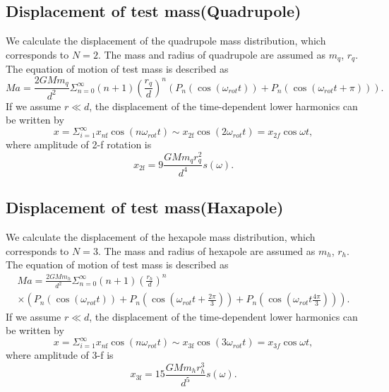 \documentclass[12pt]{iopart}
\begin{document}
\subsection{Displacement of test mass(Quadrupole)} \label{Quad}
We calculate the displacement of the quadrupole mass distribution, which corresponds to $N=2$.
The mass and radius of quadrupole are assumed as $m_q$, $r_q$. 
The equation of motion of test mass is described as
\begin{equation}
Ma=\frac{2GMm_q}{d^2}\Sigma^{\infty}_{n=0}(n+1) \left( \frac{r_q}{d} \right)^n \left( P_n\left(\cos{\left(\omega_{rot} t \right)}\right) + P_n\left(\cos{\left(\omega_{rot} t +\pi \right)}\right) \right).
\end{equation} 
If we assume $r \ll d$, the displacement of the time-dependent lower harmonics can be written by 
\begin{equation}
x=\Sigma_{i=1}^{\infty}x_{n\mathrm{f}}\cos(n\omega_{rot} t)\sim x_{2\mathrm{f}}\cos(2\omega_{rot} t)=x_{2f}\cos{\omega t},
\end{equation}
where amplitude of 2-f rotation is
\begin{equation}
x_{2\mathrm{f}}=9\frac{GMm_{q}r_{q}^2}{d^4}s(\omega). \label{2f}
\end{equation}

\subsection{Displacement of test mass(Haxapole)} \label{Hexa}
We calculate the displacement of the hexapole mass distribution, which corresponds to $N=3$.
The mass and radius of hexapole are assumed as $m_h$, $r_h$. 
The equation of motion of test mass is described as
\begin{eqnarray}
Ma = \frac{2GMm_h}{d^2}\Sigma^{\infty}_{n=0}(n+1) \left( \frac{r_h}{d} \right)^n \\
\times \left( P_n\left(\cos{\left(\omega_{rot} t \right)}\right) + P_n\left(\cos{\left(\omega_{rot} t+\frac{2\pi}{3} \right)} \right) + P_n\left(\cos{\left(\omega_{rot} t \frac{4\pi}{3} \right) }\right) \right).
\end{eqnarray} 
If we assume $r \ll d$, the displacement of the time-dependent lower harmonics can be written by 
\begin{equation}
x=\Sigma_{i=1}^{\infty}x_{n\mathrm{f}}\cos(n\omega_{rot} t)\sim  x_{3\mathrm{f}}\cos(3\omega_{rot} t)=x_{3f}\cos{\omega t},
\end{equation}
where amplitude of 3-f is
\begin{equation}
 x_{3\mathrm{f}}=15\frac{GMm_{h}r_{h}^3}{d^5}s(\omega). \label{3f}
\end{equation}
\end{document}
